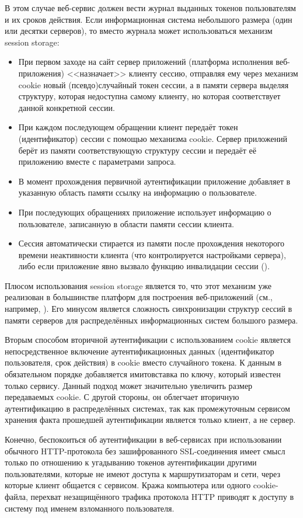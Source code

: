 В этом случае веб-сервис должен вести журнал выданных токенов пользователям и их сроков действия. Если информационная система небольшого размера (один или десятки серверов), то вместо журнала может использоваться механизм session storage:
\begin{itemize}
	\item При первом заходе на сайт сервер приложений (платформа исполнения веб-приложения) <<назначает>> клиенту сессию, отправляя ему через механизм cookie новый (псевдо)случайный токен сессии, а в памяти сервера выделяя структуру, которая недоступна самому клиенту, но которая соответствует данной конкретной сессии.
	\item При каждом последующем обращении клиент передаёт токен (идентификатор) сессии с помощью механизма cookie. Сервер приложений берёт из памяти соответствующую структуру сессии и передаёт её приложению вместе с параметрами запроса.
	\item В момент прохождения первичной аутентификации приложение добавляет в указанную область памяти ссылку на информацию о пользователе.
	\item При последующих обращениях приложение использует информацию о пользователе, записанную в области памяти сессии клиента.
	\item Сессия автоматически стирается из памяти после прохождения некоторого времени неактивности клиента (что контролируется настройками сервера), либо если приложение явно вызвало функцию инвалидации сессии ().
\end{itemize}

Плюсом использования session storage является то, что этот механизм уже реализован в большинстве платформ для построения веб-приложений (см., например, \cite[Controlling sessions]{Brittain:Darwin:2007}). Его минусом является сложность синхронизации структур сессий в памяти серверов для распределённых информационных систем большого размера.

Вторым способом вторичной аутентификации с использованием cookie является непосредственное включение аутентификационных данных (идентификатор пользователя, срок действия) в cookie вместо случайного токена. К данным в обязательном порядке добавляется имитовставка по ключу, который известен только сервису. Данный подход может значительно увеличить размер передаваемых cookie. С другой стороны, он облегчает вторичную аутентификацию в распределённых системах, так как промежуточным сервисом хранения факта прошедшей аутентификации является только клиент, а не сервер.

Конечно, беспокоиться об аутентификации в веб-сервисах при использовании обычного HTTP-протокола без зашифрованного SSL-соединения имеет смысл только по отношению к угадыванию токенов аутентификации другими пользователями, которые не имеют доступа к маршрутизаторам и сети, через которые клиент общается с сервисом. Кража компьютера или одного cookie-файла, перехват незащищённого трафика протокола HTTP приводят к доступу в систему под именем взломанного пользователя.
